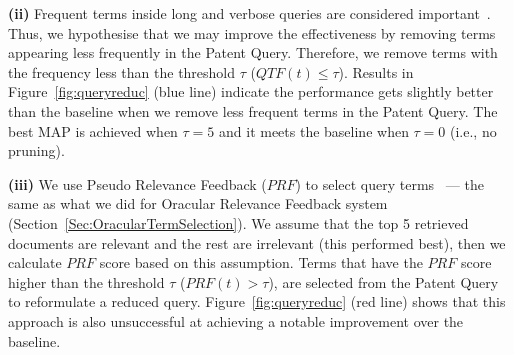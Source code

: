 \vspace*{0.5mm}
\noindent \textbf{(ii)} Frequent terms inside long and verbose queries are considered important~\cite{maxwell2013compact}. Thus, we hypothesise that we may improve the effectiveness by removing terms appearing less frequently in the Patent Query. Therefore, we remove terms with the frequency less than the threshold $\tau$ ($QTF(t) \leq \tau$). Results in Figure~\ref{fig:queryreduc} (blue line) indicate the performance gets slightly better than the baseline when we remove less frequent terms in the Patent Query. The best MAP is achieved when $\tau=5$ and it meets the baseline when $\tau=0$ (i.e., no pruning). 

\vspace*{0.5mm}
\noindent \textbf{(iii)} We use Pseudo Relevance Feedback ($\mathit{PRF}$) to select query terms~\cite{maxwell2013compact} --- the same as what we did for Oracular Relevance Feedback system (Section~\ref{Sec:OracularTermSelection}). We assume that the top 5 retrieved documents are relevant and the rest are irrelevant (this performed best), then we calculate $\mathit{PRF}$ score based on this assumption.  
Terms that have the $\mathit{PRF}$ score higher than the threshold $\tau$ ($PRF(t)>\tau$), are selected from the Patent Query to reformulate a reduced query. Figure~\ref{fig:queryreduc} (red line) shows that this approach is also unsuccessful at achieving a notable improvement over the baseline.


